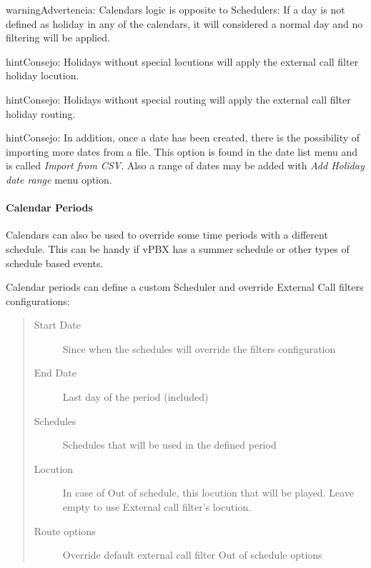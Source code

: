\documentclass[letterpaper,10pt,spanish]{sphinxmanual}
\begin{document}
\begin{notice}{warning}{Advertencia:}
Calendars logic is opposite to Schedulers: If a day is not defined
as holiday in any of the calendars, it will considered a normal day and no
filtering will be applied.
\end{notice}

\begin{notice}{hint}{Consejo:}
Holidays without special locutions will apply the external call filter
holiday locution.
\end{notice}

\begin{notice}{hint}{Consejo:}
Holidays without special routing will apply the external call filter
holiday routing.
\end{notice}

\begin{notice}{hint}{Consejo:}
In addition, once a date has been created, there is the possibility of
importing more dates from a file. This option is found in the date list menu and
is called \emph{Import from CSV}.
Also a range of dates may be added with \emph{Add Holiday date range} menu option.
\end{notice}


\paragraph{Calendar Periods}
\label{administration_portal/client/vpbx/routing_tools/calendars:calendar-periods}\label{administration_portal/client/vpbx/routing_tools/calendars:id2}
Calendars can also be used to override some time periods with a different schedule.
This can be handy if vPBX has a summer schedule or other types of schedule based events.

Calendar periods can define a custom Scheduler and override External Call filters configurations:
\begin{quote}
\begin{description}
\item[{Start Date}] \leavevmode
Since when the schedules will override the filters configuration

\item[{End Date}] \leavevmode
Last day of the period (included)

\item[{Schedules}] \leavevmode
Schedules that will be used in the defined period

\item[{Locution}] \leavevmode
In case of Out of schedule, this locution that will be played. Leave empty to use External
call filter's locution.

\item[{Route options}] \leavevmode
Override default external call filter Out of schedule options

\end{description}
\end{quote}
\end{document}

